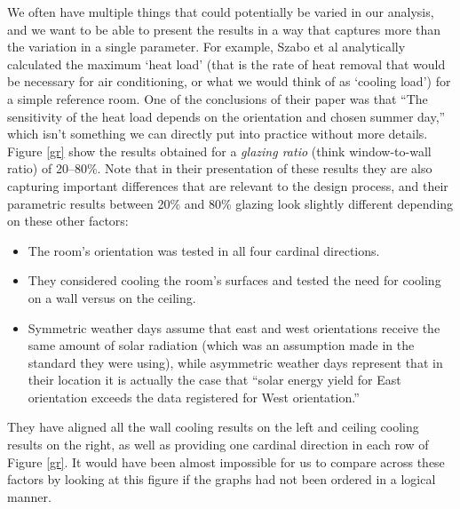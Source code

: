 \documentclass[10pt]{article}
\begin{document}
We often have multiple things that could potentially be varied in our analysis, and we want to be able to present the results in a way that captures more than the variation in a single parameter. For example, Szabo et al \cite{L_Szabo2018-nh} analytically calculated the maximum `heat load' (that is the rate of heat removal that would be necessary for air conditioning, or what we would think of as `cooling load') for a simple reference room. One of the conclusions of their paper was that ``The sensitivity of the heat load depends on the orientation and chosen summer day,'' which isn't something we can directly put into practice without more details. Figure \ref{gr} show the results obtained for a \textit{glazing ratio} (think window-to-wall ratio) of 20--80\%. Note that in their presentation of these results they are also capturing important differences that are relevant to the design process, and their parametric results between 20\% and 80\% glazing look slightly different depending on these other factors:

\vspace{-3pt}
\begin{itemize}
    \setlength{\itemsep}{0pt}%
    \setlength{\parskip}{0pt}%
    \item The room's orientation was tested in all four cardinal directions.
    \item They considered cooling the room's surfaces and tested the need for cooling on a wall versus on the ceiling.
    \item Symmetric weather days assume that east and west orientations receive the same amount of solar radiation (which was an assumption made in the standard they were using), while asymmetric weather days represent that in their location it is actually the case that ``solar energy yield for East orientation exceeds the data registered for West orientation.'' \cite{L_Szabo2018-nh}
\end{itemize}
\vspace{-3pt}

They have aligned all the wall cooling results on the left and ceiling cooling results on the right, as well as providing one cardinal direction in each row of Figure \ref{gr}. It would have been almost impossible for us to compare across these factors by looking at this figure if the graphs had not been ordered in a logical manner.
\end{document}
